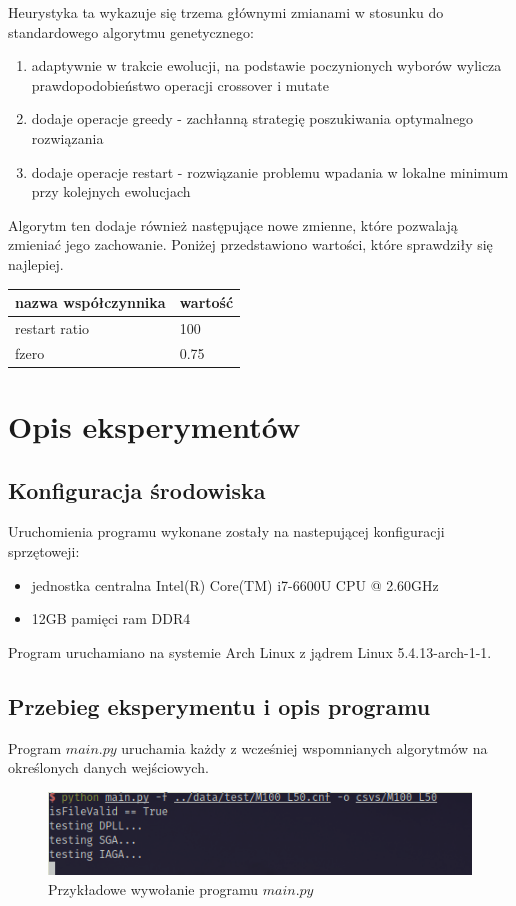\documentclass[10pt]{article}
\begin{document}
Heurystyka ta wykazuje się trzema głównymi zmianami w stosunku do standardowego algorytmu genetycznego:
\begin{enumerate}
  \item adaptywnie w trakcie ewolucji, na podstawie poczynionych wyborów wylicza prawdopodobieństwo operacji crossover i mutate
  \item dodaje operacje greedy - zachłanną strategię poszukiwania optymalnego rozwiązania
  \item dodaje operacje restart - rozwiązanie problemu wpadania w lokalne minimum przy kolejnych ewolucjach
\end{enumerate}

Algorytm ten dodaje również następujące nowe zmienne, które pozwalają zmieniać jego zachowanie. Poniżej przedstawiono wartości, które sprawdziły się najlepiej.
\begin{center}
		\begin{tabular}{|C{5cm}|C{5cm}|}
			\hline
			\textbf{nazwa współczynnika} & \textbf{wartość} \\ \hline
      {restart ratio} & 100 \\ \hline
      {fzero} & 0.75 \\ \hline
		\end{tabular}
\end{center}

\section{Opis eksperymentów}
\subsection{Konfiguracja środowiska}
Uruchomienia programu wykonane zostały na nastepującej konfiguracji sprzętoweji:
\begin{itemize}
  \item jednostka centralna Intel(R) Core(TM) i7-6600U CPU @ 2.60GHz
  \item 12GB pamięci ram DDR4
\end{itemize}
Program uruchamiano na systemie Arch Linux z jądrem Linux 5.4.13-arch-1-1.

\subsection{Przebieg eksperymentu i opis programu}
Program $main.py$ uruchamia każdy z wcześniej wspomnianych algorytmów na określonych danych wejściowych.
\begin{figure}[h]
\centering
\includegraphics[scale=0.5]{img/single_run.png} \\
Przykładowe wywołanie programu $main.py$
\end{figure}
\end{document}
